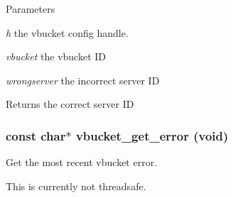 \begin{DoxyParams}{Parameters}
\item[{\em h}]the vbucket config handle. \item[{\em vbucket}]the vbucket ID \item[{\em wrongserver}]the incorrect server ID\end{DoxyParams}
\begin{DoxyReturn}{Returns}
the correct server ID 
\end{DoxyReturn}
\hypertarget{group__err_ga3048aad4cad83312f3ddb23b238cde1a}{
\subsubsection[{vbucket\_\-get\_\-error}]{\setlength{\rightskip}{0pt plus 5cm}const char$\ast$ vbucket\_\-get\_\-error (void)}}
\label{group__err_ga3048aad4cad83312f3ddb23b238cde1a}


Get the most recent vbucket error. 

This is currently not threadsafe. 